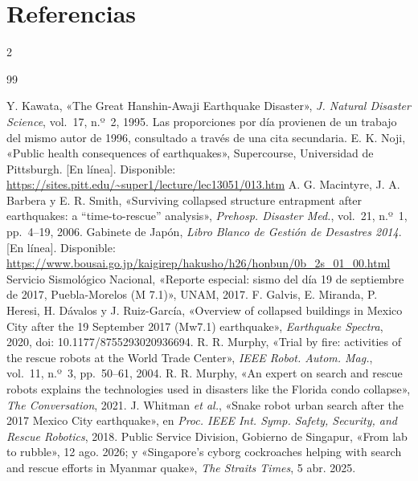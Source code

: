 \renewcommand{\refname}{Referencias}
\begingroup
\section*{Referencias}
\scriptsize
\setlength{\columnsep}{16pt}
\begin{multicols}{2}
\RaggedRight
\makeatletter\renewcommand{\@biblabel}[1]{[#1]}\makeatother
\renewcommand{\section}[2]{}
\begin{thebibliography}{99}
\setlength{\itemsep}{0.5pt}

 Y. Kawata, «The Great Hanshin-Awaji Earthquake Disaster», \textit{J. Natural Disaster Science}, vol.~17, n.º~2, 1995. Las proporciones por día provienen de un trabajo del mismo autor de 1996, consultado a través de una cita secundaria.
 E. K. Noji, «Public health consequences of earthquakes», Supercourse, Universidad de Pittsburgh. [En línea]. Disponible: \url{https://sites.pitt.edu/~super1/lecture/lec13051/013.htm}
 A. G. Macintyre, J. A. Barbera y E. R. Smith, «Surviving collapsed structure entrapment after earthquakes: a ``time-to-rescue'' analysis», \textit{Prehosp. Disaster Med.}, vol.~21, n.º~1, pp.~4--19, 2006.
 Gabinete de Japón, \textit{Libro Blanco de Gestión de Desastres 2014}. [En línea]. Disponible: \url{https://www.bousai.go.jp/kaigirep/hakusho/h26/honbun/0b_2s_01_00.html}
 Servicio Sismológico Nacional, «Reporte especial: sismo del día 19 de septiembre de 2017, Puebla-Morelos (M 7.1)», UNAM, 2017.
 F. Galvis, E. Miranda, P. Heresi, H. Dávalos y J. Ruiz-García, «Overview of collapsed buildings in Mexico City after the 19 September 2017 (Mw7.1) earthquake», \textit{Earthquake Spectra}, 2020, doi: 10.1177/8755293020936694.
 R. R. Murphy, «Trial by fire: activities of the rescue robots at the World Trade Center», \textit{IEEE Robot. Autom. Mag.}, vol.~11, n.º~3, pp.~50--61, 2004.
 R. R. Murphy, «An expert on search and rescue robots explains the technologies used in disasters like the Florida condo collapse», \textit{The Conversation}, 2021.
 J. Whitman \textit{et al.}, «Snake robot urban search after the 2017 Mexico City earthquake», en \textit{Proc. IEEE Int. Symp. Safety, Security, and Rescue Robotics}, 2018.
 Public Service Division, Gobierno de Singapur, «From lab to rubble», 12 ago. 2026; y «Singapore's cyborg cockroaches helping with search and rescue efforts in Myanmar quake», \textit{The Straits Times}, 5 abr. 2025.

\end{thebibliography}
\end{multicols}
